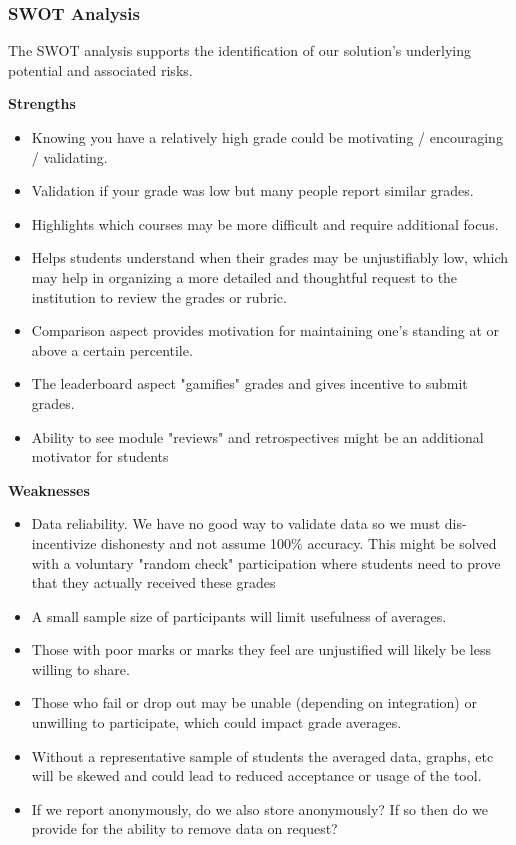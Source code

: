 \noindent \subsubsection{SWOT Analysis}
The SWOT analysis supports the identification of our solution's underlying potential and associated risks.
\smallskip

\noindent \textbf{Strengths}
\begin{itemize}
    \item Knowing you have a relatively high grade could be motivating / encouraging / validating.
    \item Validation if your grade was low but many people report similar grades.
    \item Highlights which courses may be more difficult and require additional focus.
    \item Helps students understand when their grades may be unjustifiably low, which may help in organizing a more detailed and thoughtful request to the institution to review the grades or rubric.
    \item Comparison aspect provides motivation for maintaining one's standing at or above a certain percentile.
    \item The leaderboard aspect "gamifies" grades and gives incentive to submit grades.
    \item Ability to see module "reviews" and retrospectives might be an additional motivator for students
\end{itemize}
\textbf{Weaknesses}
\begin{itemize}
    \item Data reliability. We have no good way to validate data so we must dis-incentivize dishonesty and not assume 100\% accuracy. This might be solved with a voluntary "random check" participation where students need to prove that they actually received these grades
    \item A small sample size of participants will limit usefulness of averages.
    \item Those with poor marks or marks they feel are unjustified will likely be less willing to share.
    \item Those who fail or drop out may be unable (depending on integration) or unwilling to participate, which could impact grade averages.
    \item Without a representative sample of students the averaged data, graphs, etc will be skewed and could lead to reduced acceptance or usage of the tool.
    \item If we report anonymously, do we also store anonymously? If so then do we provide for the ability to remove data on request?
\end{itemize}
